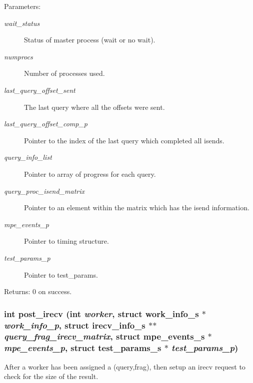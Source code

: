 \begin{Desc}
\item[Parameters:]
\begin{description}
\item[{\em wait\_\-status}]Status of master process (wait or no wait). \item[{\em numprocs}]Number of processes used. \item[{\em last\_\-query\_\-offset\_\-sent}]The last query where all the offsets were sent. \item[{\em last\_\-query\_\-offset\_\-comp\_\-p}]Pointer to the index of the last query which completed all isends. \item[{\em query\_\-info\_\-list}]Pointer to array of progress for each query. \item[{\em query\_\-proc\_\-isend\_\-matrix}]Pointer to an element within the matrix which has the isend information. \item[{\em mpe\_\-events\_\-p}]Pointer to timing structure. \item[{\em test\_\-params\_\-p}]Pointer to test\_\-params. \end{description}
\end{Desc}
\begin{Desc}
\item[Returns:]0 on success. \end{Desc}
\subsubsection{\setlength{\rightskip}{0pt plus 5cm}int post\_\-irecv (int {\em worker}, struct \bf{work\_\-info\_\-s} $\ast$ {\em work\_\-info\_\-p}, struct \bf{irecv\_\-info\_\-s} $\ast$$\ast$ {\em query\_\-frag\_\-irecv\_\-matrix}, struct \bf{mpe\_\-events\_\-s} $\ast$ {\em mpe\_\-events\_\-p}, struct \bf{test\_\-params\_\-s} $\ast$ {\em test\_\-params\_\-p})}\label{master__help_8c_3907598dcc26cd2eac68061480abb332}


After a worker has been assigned a (query,frag), then setup an irecv request to check for the size of the result.

